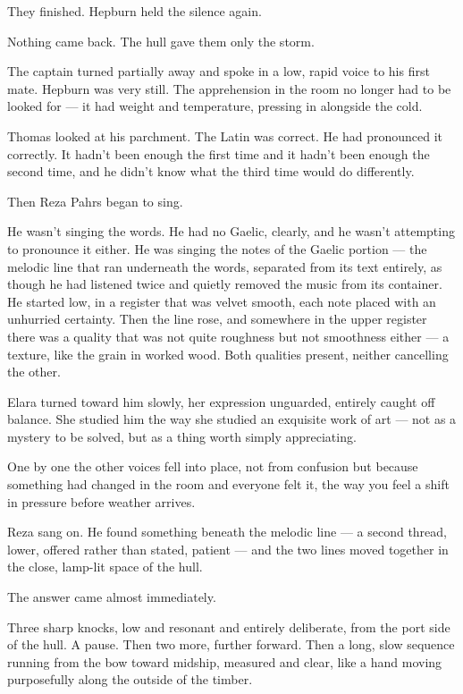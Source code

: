 They finished. Hepburn held the silence again.

Nothing came back. The hull gave them only the storm.

The captain turned partially away and spoke in a low, rapid voice to his first mate. Hepburn was very still. The apprehension in the room no longer had to be looked for — it had weight and temperature, pressing in alongside the cold.

Thomas looked at his parchment. The Latin was correct. He had pronounced it correctly. It hadn't been enough the first time and it hadn't been enough the second time, and he didn't know what the third time would do differently.

Then Reza Pahrs began to sing.

He wasn't singing the words. He had no Gaelic, clearly, and he wasn't attempting to pronounce it either. He was singing the notes of the Gaelic portion --- the melodic line that ran underneath the words, separated from its text entirely, as though he had listened twice and quietly removed the music from its container. He started low, in a register that was velvet smooth, each note placed with an unhurried certainty. Then the line rose, and somewhere in the upper register there was a quality that was not quite roughness but not smoothness either --- a texture, like the grain in worked wood. Both qualities present, neither cancelling the other.

Elara turned toward him slowly, her expression unguarded, entirely caught off balance. She studied him the way she studied an exquisite work of art — not as a mystery to be solved, but as a thing worth simply appreciating.

One by one the other voices fell into place, not from confusion but because something had changed in the room and everyone felt it, the way you feel a shift in pressure before weather arrives.

Reza sang on. He found something beneath the melodic line --- a second thread, lower, offered rather than stated, patient --- and the two lines moved together in the close, lamp-lit space of the hull.

The answer came almost immediately.

Three sharp knocks, low and resonant and entirely deliberate, from the port side of the hull. A pause. Then two more, further forward. Then a long, slow sequence running from the bow toward midship, measured and clear, like a hand moving purposefully along the outside of the timber.

